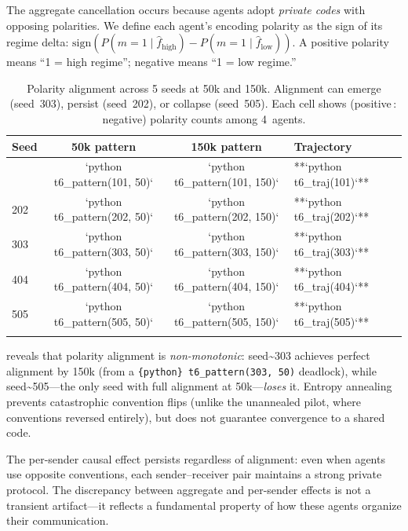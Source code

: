 \documentclass[
  10pt,
  letterpaper,
]{article}
\newcommand{\fhat}{\hat{f}}
\begin{document}
The aggregate cancellation occurs because agents adopt \emph{private
codes} with opposing polarities. We define each agent's encoding
polarity as the sign of its regime delta:
\(\text{sign}(P(m\!=\!1 \mid \fhat_{\text{high}}) - P(m\!=\!1 \mid \fhat_{\text{low}}))\).
A positive polarity means ``1 = high regime''; negative means ``1 = low
regime.''

\begin{table}[t]
  \caption{Polarity alignment across 5 seeds at 50k and 150k. Alignment can emerge (seed~303), persist (seed~202), or collapse (seed~505). Each cell shows (positive\,:\,negative) polarity counts among 4~agents.}
  
  \centering
  \small
  \begin{tabular}{lccl}
    \toprule
    Seed & 50k pattern & 150k pattern & Trajectory \\
    \midrule

\begin{verbatim}
101 & `{python} t6_pattern(101, 50)` & `{python} t6_pattern(101, 150)` & **`{python} t6_traj(101)`** \\
202 & `{python} t6_pattern(202, 50)` & `{python} t6_pattern(202, 150)` & **`{python} t6_traj(202)`** \\
303 & `{python} t6_pattern(303, 50)` & `{python} t6_pattern(303, 150)` & **`{python} t6_traj(303)`** \\
404 & `{python} t6_pattern(404, 50)` & `{python} t6_pattern(404, 150)` & **`{python} t6_traj(404)`** \\
505 & `{python} t6_pattern(505, 50)` & `{python} t6_pattern(505, 150)` & **`{python} t6_traj(505)`** \\
\end{verbatim}

    \bottomrule
  \end{tabular}
\end{table}

\citet{tab:alignment} reveals that polarity alignment is
\emph{non-monotonic}: seed\textasciitilde303 achieves perfect alignment
by 150k (from a \texttt{\{python\}\ t6\_pattern(303,\ 50)} deadlock),
while seed\textasciitilde505---the only seed with full alignment at
50k---\emph{loses} it. Entropy annealing prevents catastrophic
convention flips (unlike the unannealed pilot, where conventions
reversed entirely), but does not guarantee convergence to a shared code.

The per-sender causal effect persists regardless of alignment: even when
agents use opposite conventions, each sender--receiver pair maintains a
strong private protocol. The discrepancy between aggregate and
per-sender effects is not a transient artifact---it reflects a
fundamental property of how these agents organize their communication.
\end{document}
